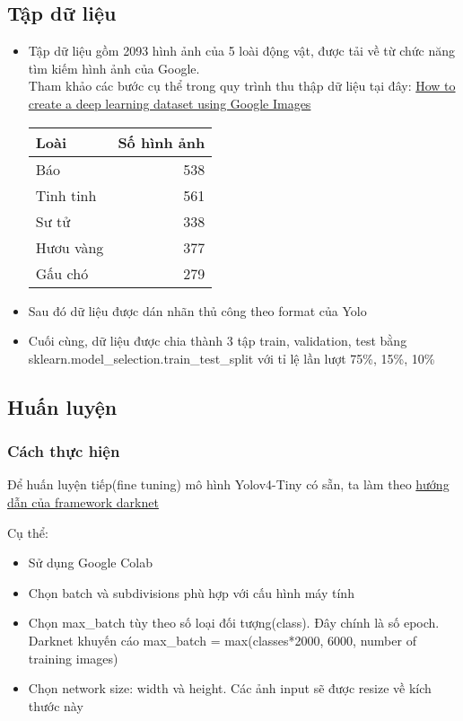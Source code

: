 \documentclass[20pt, a4paper]{article}
\begin{document}
\subsection{Tập dữ liệu}
\begin{itemize}
	\item
Tập dữ liệu gồm 2093 hình ảnh của 5 loài động vật, được tải về từ chức năng tìm kiếm hình ảnh của Google.\\
Tham khảo các bước cụ thể trong quy trình thu thập dữ liệu tại đây: \href{https://www.pyimagesearch.com/2017/12/04/how-to-create-a-deep-learning-dataset-using-google-images/}{How to create a deep learning dataset using Google Images}

\begin{tabular}{l | r}
	\textbf{Loài} & \textbf{Số hình ảnh} \\
	\hline
	Báo & 538 \\
	Tinh tinh & 561 \\
	Sư tử & 338 \\
	Hươu vàng & 377 \\
	Gấu chó & 279 \\
\end{tabular}

\item
Sau đó dữ liệu được dán nhãn thủ công theo format của Yolo

\item
Cuối cùng, dữ liệu được chia thành 3 tập train, validation, test bằng 
sklearn.model\_selection.train\_test\_split với tỉ lệ lần lượt 75\%, 15\%, 10\%
\end{itemize}

\subsection{Huấn luyện}
\subsubsection{Cách thực hiện}
Để huấn luyện tiếp(fine tuning) mô hình Yolov4-Tiny có sẵn, ta làm theo 
\href{https://github.com/AlexeyAB/darknet#how-to-train-tiny-yolo-to-detect-your-custom-objects}{hướng dẫn của framework darknet}

Cụ thể:
\begin{itemize}
	\item Sử dụng Google Colab
	\item Chọn batch và subdivisions phù hợp với cấu hình máy tính
	\item Chọn max\_batch tùy theo số loại đối tượng(class). Đây chính là số epoch. \\
		Darknet khuyến cáo max\_batch = max(classes*2000, 6000, number of training images)
	\item Chọn network size: width và height. Các ảnh input sẽ được resize về kích thước này
\end{itemize}
\end{document}
